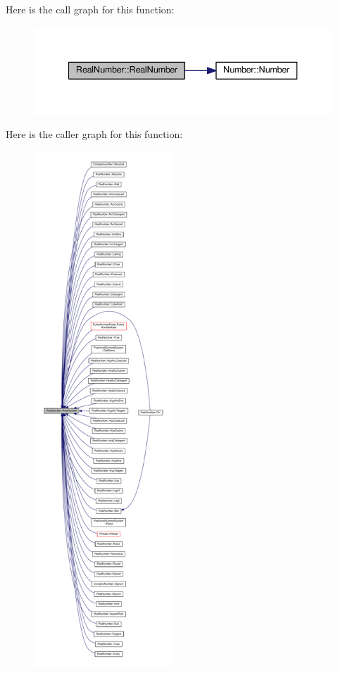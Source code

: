 Here is the call graph for this function\+:
\nopagebreak
\begin{figure}[H]
\begin{center}
\leavevmode
\includegraphics[width=340pt]{d2/d49/structRealNumber_a65924261adb775498f3b1b0f41f89091_cgraph}
\end{center}
\end{figure}




Here is the caller graph for this function\+:
\nopagebreak
\begin{figure}[H]
\begin{center}
\leavevmode
\includegraphics[height=550pt]{d2/d49/structRealNumber_a65924261adb775498f3b1b0f41f89091_icgraph}
\end{center}
\end{figure}



